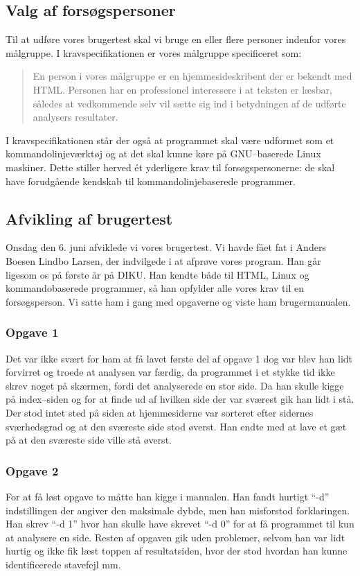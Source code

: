\documentclass[a4paper,oneside]{memoir}
\begin{document}
\subsection{Valg af forsøgspersoner}
Til at udføre vores brugertest skal vi bruge en eller flere personer
indenfor vores målgruppe. I kravspecifikationen er vores målgruppe
specificeret som:
\begin{quote}
En person i vores målgruppe er en hjemmesideskribent der er bekendt
med HTML. Personen har en professionel interessere i at teksten er
læsbar, således at vedkommende selv vil sætte sig ind i betydningen af
de udførte analysers resultater.
\end{quote}

I kravspecifikationen står der også at programmet skal være udformet
som et kommandolinjeværktøj og at det skal kunne køre på GNU--baserede
Linux maskiner. Dette stiller herved ét yderligere krav til
forsøgspersonerne: de skal have forudgående kendskab til
kommando\-linje\-baserede programmer.

\subsection{Afvikling af brugertest}
Onsdag den 6. juni afviklede vi vores brugertest. Vi havde fået fat i
Anders Boesen Lindbo Larsen, der indvilgede i at afprøve vores
program. Han går ligesom os på første år på DIKU. Han kendte både til
HTML, Linux og kommandobaserede programmer, så han opfylder alle vores
krav til en forsøgsperson. Vi satte ham i gang med opgaverne og viste
ham brugermanualen.

\subsubsection{Opgave 1}
Det var ikke svært for ham at få lavet første del af opgave 1 dog var
blev han lidt forvirret og troede at analysen var færdig, da
programmet i et stykke tid ikke skrev noget på skærmen, fordi det
analyserede en stor side. Da han skulle kigge på index--siden og for
at finde ud af hvilken side der var sværest gik han lidt i stå. Der
stod intet sted på siden at hjemmesiderne var sorteret efter sidernes
sværhedsgrad og at den sværeste side stod øverst. Han endte med at
lave et gæt på at den sværeste side ville stå øverst.

\subsubsection{Opgave 2}
For at få løst opgave to måtte han kigge i manualen. Han fandt hurtigt
``-d'' indstillingen der angiver den maksimale dybde, men han
misforstod forklaringen. Han skrev ``-d 1'' hvor han skulle have
skrevet ``-d 0'' for at få programmet til kun at analysere en side.
Resten af opgaven gik uden problemer, selvom han var lidt hurtig og
ikke fik læst toppen af resultatsiden, hvor der stod hvordan han kunne
identificerede stavefejl mm.
\end{document}
